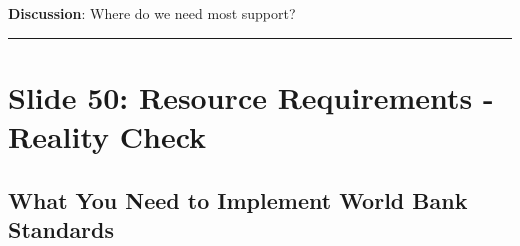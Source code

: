 \documentclass[
]{article}
\begin{document}
\textbf{Discussion}: Where do we need most support?

\begin{center}\rule{0.5\linewidth}{0.5pt}\end{center}

\section{Slide 50: Resource Requirements - Reality
Check}\label{slide-50-resource-requirements---reality-check}

\subsection{What You Need to Implement World Bank
Standards}\label{what-you-need-to-implement-world-bank-standards}
\end{document}
